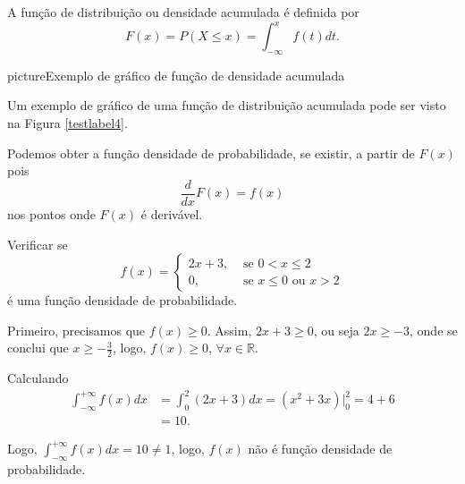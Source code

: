 \documentclass[11pt,fleqn]{book}
\numberwithin{mpicture}{chapter}
\numberwithin{mtable}{chapter}
\numberwithin{mframe}{chapter}
\begin{document}
\begin{definition}
	A função de distribuição ou densidade acumulada é definida por
	\begin{equation}
		F(x)=P(X\leqslant x)=\int_{-\infty}^{x} f(t)dt
		\text{.}
	\end{equation}
\end{definition}

\begin{sidepicture}{0cm}{picture}{Exemplo de gráfico de função de densidade acumulada}
	\label{testlabel4}
\end{sidepicture}

Um exemplo de gráfico de uma função de distribuição acumulada pode ser visto na Figura \ref{testlabel4}.

\begin{remark}
	Podemos obter a função densidade de probabilidade, se existir, a partir de $F(x)$ pois
	\[
		\frac{d}{dx}F(x) = f(x)
	\]
	nos pontos onde $F(x)$ é derivável.
\end{remark}

\begin{example}
	Verificar se
	\[
		f(x)= \begin{cases}
			2x+3, &\text{ se } 0<x\leqslant 2\\
			0, &\text{ se } x \leqslant 0 \text{ ou } x > 2
		\end{cases}
	\]
	é uma função densidade de probabilidade.
	
	Primeiro, precisamos que  $f(x)\geqslant 0$. Assim, $2x+3\geqslant 0$, ou seja $2x\geqslant -3$, onde se conclui que $x \geqslant -\frac{3}{2}$, logo, $f(x)\geqslant 0$, $\forall x\in \mathbb{R}$.
	
	Calculando
	\begin{align*}
		\int_{-\infty}^{+\infty} f(x) dx &= \int_{0}^{2} (2x + 3)dx = (x^2+3x)\Big|_{0}^{2} = 4 + 6\\
										  &= 10\text{.}
	\end{align*}
	
	Logo, $\displaystyle \int_{-\infty}^{+\infty} f(x)dx = 10 \neq 1$, logo, $f(x)$ não é função densidade de probabilidade.
\end{example}
\end{document}
